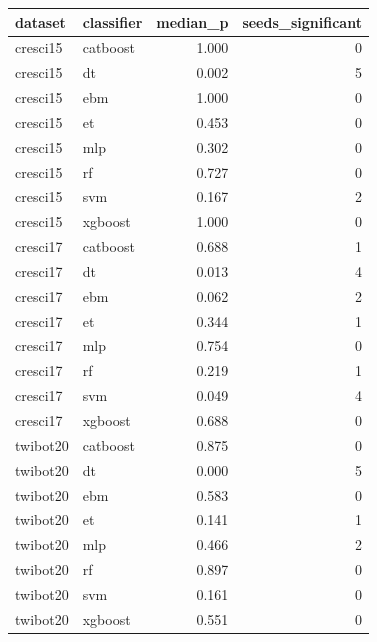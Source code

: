 \begin{tabular}{llrr}
\toprule
dataset & classifier & median_p & seeds_significant \\
\midrule
cresci15 & catboost & 1.000 & 0 \\
cresci15 & dt & 0.002 & 5 \\
cresci15 & ebm & 1.000 & 0 \\
cresci15 & et & 0.453 & 0 \\
cresci15 & mlp & 0.302 & 0 \\
cresci15 & rf & 0.727 & 0 \\
cresci15 & svm & 0.167 & 2 \\
cresci15 & xgboost & 1.000 & 0 \\
cresci17 & catboost & 0.688 & 1 \\
cresci17 & dt & 0.013 & 4 \\
cresci17 & ebm & 0.062 & 2 \\
cresci17 & et & 0.344 & 1 \\
cresci17 & mlp & 0.754 & 0 \\
cresci17 & rf & 0.219 & 1 \\
cresci17 & svm & 0.049 & 4 \\
cresci17 & xgboost & 0.688 & 0 \\
twibot20 & catboost & 0.875 & 0 \\
twibot20 & dt & 0.000 & 5 \\
twibot20 & ebm & 0.583 & 0 \\
twibot20 & et & 0.141 & 1 \\
twibot20 & mlp & 0.466 & 2 \\
twibot20 & rf & 0.897 & 0 \\
twibot20 & svm & 0.161 & 0 \\
twibot20 & xgboost & 0.551 & 0 \\
\bottomrule
\end{tabular}
